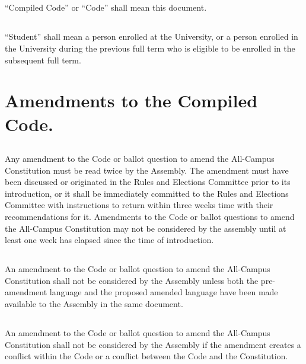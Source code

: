 \subsection{}
``Compiled Code'' or ``Code'' shall mean this document.

\subsection{}
``Student'' shall mean a person enrolled at the University, or a person enrolled in the University during the previous full term who is eligible to be enrolled in the subsequent full term.

\section{Amendments to the Compiled Code.}

\subsection{}
Any amendment to the Code or ballot question to amend the All-Campus Constitution must be read twice by the Assembly. The amendment must have been discussed or originated in the Rules and Elections Committee prior to its introduction, or it shall be immediately committed to the Rules and Elections Committee with instructions to return within three weeks time with their recommendations for it. Amendments to the Code or ballot questions to amend the All-Campus Constitution may not be considered by the assembly until at least one week has elapsed since the time of introduction. 

\subsection{}
An amendment to the Code or ballot question to amend the All-Campus Constitution shall not be considered by the Assembly unless both the pre-amendment language and the proposed amended language have been made available to the Assembly in the same document.

\subsection{}
An amendment to the Code or ballot question to amend the All-Campus Constitution shall not be considered by the Assembly if the amendment creates a conflict within the Code or a conflict between the Code and the Constitution.

